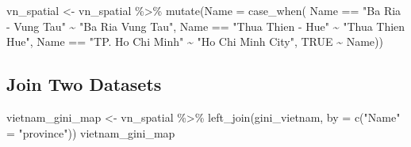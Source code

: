 \documentclass[
]{article}
\newenvironment{Shaded}{\begin{snugshade}}{\end{snugshade}}
\newcommand{\AttributeTok}[1]{\textcolor[rgb]{0.77,0.63,0.00}{#1}}
\newcommand{\ConstantTok}[1]{\textcolor[rgb]{0.00,0.00,0.00}{#1}}
\newcommand{\FunctionTok}[1]{\textcolor[rgb]{0.00,0.00,0.00}{#1}}
\newcommand{\NormalTok}[1]{#1}
\newcommand{\OtherTok}[1]{\textcolor[rgb]{0.56,0.35,0.01}{#1}}
\newcommand{\SpecialCharTok}[1]{\textcolor[rgb]{0.00,0.00,0.00}{#1}}
\newcommand{\StringTok}[1]{\textcolor[rgb]{0.31,0.60,0.02}{#1}}
\begin{document}
\begin{Shaded}
\begin{Highlighting}[]
\NormalTok{vn\_spatial }\OtherTok{\textless{}{-}}\NormalTok{ vn\_spatial }\SpecialCharTok{\%\textgreater{}\%} \FunctionTok{mutate}\NormalTok{(}\AttributeTok{Name =} \FunctionTok{case\_when}\NormalTok{(}
\NormalTok{  Name }\SpecialCharTok{==} \StringTok{"Ba Ria {-} Vung Tau"} \SpecialCharTok{\textasciitilde{}} \StringTok{"Ba Ria Vung Tau"}\NormalTok{,}
\NormalTok{  Name }\SpecialCharTok{==} \StringTok{"Thua Thien {-} Hue"} \SpecialCharTok{\textasciitilde{}} \StringTok{"Thua Thien Hue"}\NormalTok{,}
\NormalTok{  Name }\SpecialCharTok{==} \StringTok{"TP. Ho Chi Minh"} \SpecialCharTok{\textasciitilde{}} \StringTok{"Ho Chi Minh City"}\NormalTok{,}
  \ConstantTok{TRUE} \SpecialCharTok{\textasciitilde{}}\NormalTok{ Name))}
\end{Highlighting}
\end{Shaded}

\hypertarget{join-two-datasets}{%
\subsection{Join Two Datasets}\label{join-two-datasets}}

\begin{Shaded}
\begin{Highlighting}[]
\NormalTok{vietnam\_gini\_map }\OtherTok{\textless{}{-}}\NormalTok{ vn\_spatial }\SpecialCharTok{\%\textgreater{}\%} \FunctionTok{left\_join}\NormalTok{(gini\_vietnam, }\AttributeTok{by =} \FunctionTok{c}\NormalTok{(}\StringTok{"Name"} \OtherTok{=} \StringTok{"province"}\NormalTok{))}
\NormalTok{vietnam\_gini\_map}
\end{Highlighting}
\end{Shaded}
\end{document}
